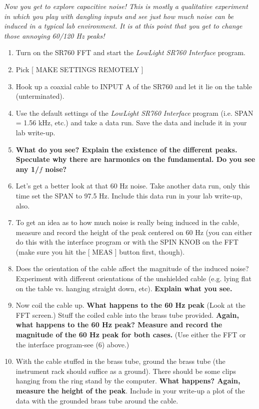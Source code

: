 \documentclass{../lab}
\begin{document}
\emph{Now you get to explore capacitive noise! This is mostly a qualitative experiment in which you play with dangling inputs and see just how much noise can be induced in a typical lab environment. It is at this point that you get to change those annoying 60/120 Hz peaks!}

\begin{enumerate}
    \item Turn on the SR760 FFT and start the \emph{LowLight SR760 Interface} program.

    \item Pick [ MAKE SETTINGS REMOTELY ]

    \item Hook up a coaxial cable to INPUT A of the SR760 and let it lie on the table (unterminated).

    \item Use the default settings of the \emph{LowLight SR760 Interface} program (i.e. SPAN = 1.56 kHz, etc.) and take a data run. Save the data and include it in your lab write-up.

    \item \textbf{What do you see? Explain the existence of the different peaks. Speculate why there are harmonics on the fundamental. Do you see any 1/$f$ noise?}

    \item Let's get a better look at that 60 Hz noise. Take another data run, only this time set the SPAN to 97.5 Hz. Include this data run in your lab write-up, also.

    \item To get an idea as to how much noise is really being induced in the cable, measure and record the height of the peak centered on 60 Hz (you can either do this with the interface program or with the SPIN KNOB on the FFT (make sure you hit the [ MEAS ] button first, though).

    \item Does the orientation of the cable affect the magnitude of the induced noise? Experiment with different orientations of the unshielded cable (e.g. lying flat on the table vs. hanging straight down, etc). \textbf{Explain what you see.}

    \item Now coil the cable up. \textbf{What happens to the 60 Hz peak} (Look at the FFT screen.) Stuff the coiled cable into the brass tube provided. \textbf{Again, what happens to the 60 Hz peak? Measure and record the magnitude of the 60 Hz peak for both cases.} (Use either the FFT or the interface program-see (6) above.)

    \item With the cable stuffed in the brass tube, ground the brass tube (the instrument rack should suffice as a ground). There should be some clips hanging from the ring stand by the computer. \textbf{What happens? Again, measure the height of the peak}. Include in your write-up a plot of the data with the grounded brass tube around the cable.

\end{enumerate}
\end{document}
